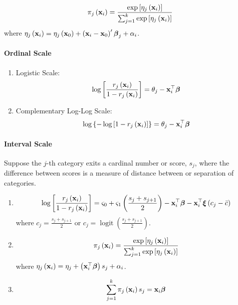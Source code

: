 \begin{equation}
	\pi_{j}\left(\mathbf{x}_{i}\right)=\frac{\exp \left[\eta_{j}\left(\mathbf{x}_{i}\right)\right]}{\sum_{j=1}^{k} \exp \left[\eta_{j}\left(\mathbf{x}_{i}\right)\right]}
\end{equation}
where \(\eta_{j}\left(\mathbf{x}_{i}\right)=\eta_{j}\left(\mathbf{x}_{0}\right)+\left(\mathbf{x}_{i}-\mathbf{x}_{0}\right)^{\prime}\boldsymbol{\beta}_{j}+\alpha_{i}\).

\paragraph*{Ordinal Scale}

\begin{enumerate}
	\item Logistic Scale:
	      \begin{equation}
		      \log\left[\frac{r_{j}\left(\mathbf{x}_{i}\right)}{1-r_{j}\left(\mathbf{x}_{i}\right)}\right]=\theta_{j}-\mathbf{x}_{i}^{\top}\boldsymbol{\beta}
	      \end{equation}
	\item Complementary Log-Log Scale:
	      \begin{equation}
		      \log\left\{-\log\left[1-r_{j}\left(\mathbf{x}_{i}\right)\right]\right\}=\theta_{j}-\mathbf{x}_{i}^{\top}\boldsymbol{\beta}
	      \end{equation}
\end{enumerate}

\paragraph*{Interval Scale}

Suppose the \(j\)-th category exits a cardinal number or score, \(s_j\), where the difference between scores is a measure of distance between or separation of categories.

\begin{enumerate}
	\item \begin{equation}
		      \log\left[\frac{r_{j}\left(\mathbf{x}_{i}\right)}{1-r_{j}\left(\mathbf{x}_{i}\right)}\right]=\varsigma_{0}+\varsigma_{1}\left(\frac{s_{j}+s_{j+1}}{2}\right)-\mathbf{x}_{i}^{\top}\boldsymbol{\beta}-\mathbf{x}_{i}^{\top}\boldsymbol{\xi}\left(c_{j}-\bar{c}\right)
	      \end{equation}
	      where \(c_{j}=\frac{s_{j}+s_{j+1}}{2}\) or \(c_{j}=\operatorname{logit}\left(\frac{s_{j}+s_{j+1}}{2}\right)\).
	\item \begin{equation}
		      \pi_{j}\left(\mathbf{x}_{i}\right)=\frac{\exp \left[\eta_{j}\left(\mathbf{x}_{i}\right)\right]}{\sum_{j=1}^{k} \exp \left[\eta_{j}\left(\mathbf{x}_{i}\right)\right]}
	      \end{equation}
	      where \(\eta_{j}\left(\mathbf{x}_{i}\right)=\eta_{j}+\left(\mathbf{x}_{i}^{\top}\boldsymbol{\beta}\right)s_{j}+\alpha_{i}\).
	\item \begin{equation}
		      \sum_{j=1}^{k}\pi_{j}\left(\mathbf{x}_{i}\right)s_{j}=\mathbf{x}_{i}\boldsymbol{\beta}
	      \end{equation}
\end{enumerate}

